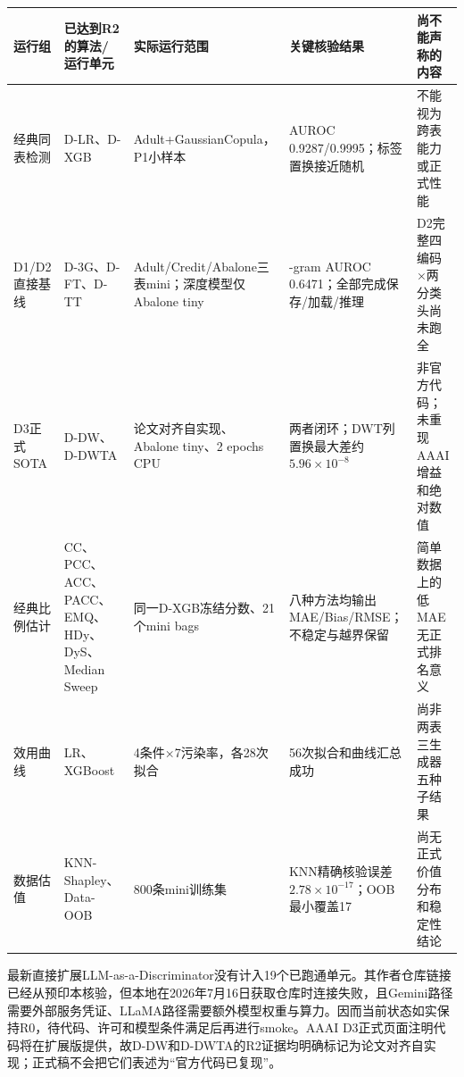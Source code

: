 \documentclass[
  chinese,
  12pt,
  a4paper,
  chinese,
  UTF8]{ctexart}
\begin{document}
\begin{longtable}[]{@{}
  >{\raggedright\arraybackslash}p{}
  >{\raggedright\arraybackslash}p{}
  >{\raggedright\arraybackslash}p{}
  >{\raggedright\arraybackslash}p{}
  >{\raggedright\arraybackslash}p{}@{}}
\toprule\noalign{}
\begin{minipage}[b]{\linewidth}\raggedright
运行组
\end{minipage} & \begin{minipage}[b]{\linewidth}\raggedright
已达到R2的算法/运行单元
\end{minipage} & \begin{minipage}[b]{\linewidth}\raggedright
实际运行范围
\end{minipage} & \begin{minipage}[b]{\linewidth}\raggedright
关键核验结果
\end{minipage} & \begin{minipage}[b]{\linewidth}\raggedright
尚不能声称的内容
\end{minipage} \\
\midrule\noalign{}
\endhead
\bottomrule\noalign{}
\endlastfoot
经典同表检测 & D-LR、D-XGB & Adult+GaussianCopula，P1小样本 & AUROC
0.9287/0.9995；标签置换接近随机 & 不能视为跨表能力或正式性能 \\
D1/D2直接基线 & D-3G、D-FT、D-TT &
Adult/Credit/Abalone三表mini；深度模型仅Abalone tiny & 3-gram AUROC
0.6471；全部完成保存/加载/推理 & D2完整四编码×两分类头尚未跑全 \\
D3正式SOTA & D-DW、D-DWTA & 论文对齐自实现、Abalone tiny、2 epochs CPU &
两者闭环；DWT列置换最大差约\(5.96\times10^{-8}\) &
非官方代码；未重现AAAI增益和绝对数值 \\
经典比例估计 & CC、PCC、ACC、PACC、EMQ、HDy、DyS、Median Sweep &
同一D-XGB冻结分数、21个mini bags &
八种方法均输出MAE/Bias/RMSE；不稳定与越界保留 &
简单数据上的低MAE无正式排名意义 \\
效用曲线 & LR、XGBoost & 4条件×7污染率，各28次拟合 &
56次拟合和曲线汇总成功 & 尚非两表三生成器五种子结果 \\
数据估值 & KNN-Shapley、Data-OOB & 800条mini训练集 &
KNN精确核验误差\(2.78\times10^{-17}\)；OOB最小覆盖17 &
尚无正式价值分布和稳定性结论 \\
\end{longtable}

最新直接扩展LLM-as-a-Discriminator没有计入19个已跑通单元。其作者仓库链接已经从预印本核验，但本地在2026年7月16日获取仓库时连接失败，且Gemini路径需要外部服务凭证、LLaMA路径需要额外模型权重与算力。因而当前状态如实保持R0，待代码、许可和模型条件满足后再进行smoke。AAAI
D3正式页面注明代码将在扩展版提供，故D-DW和D-DWTA的R2证据均明确标记为论文对齐自实现；正式稿不会把它们表述为``官方代码已复现''。
\end{document}
